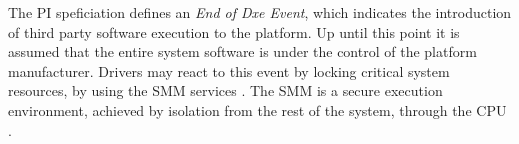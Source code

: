 The \ac{PI} speficiation defines an \emph{End of Dxe Event}, which indicates the introduction of third party software execution to the platform.
Up until this point it is assumed that the entire system software is under the control of the platform manufacturer.
Drivers may react to this event by locking critical system resources, by using the \ac{SMM} services \cite[Vol. 2, 5.1.2.1]{pi-spec}.
The \ac{SMM} is a secure execution environment, achieved by isolation from the rest of the system, through the \ac{CPU} \cite[Vol. 4, Section 1.3]{pi-spec}.





